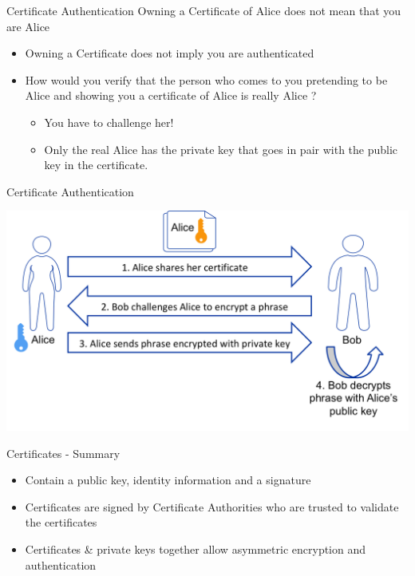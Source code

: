 \documentclass{beamer}
\begin{document}
\begin{frame}{Certificate Authentication}
Owning a Certificate of Alice does not mean that you are Alice
\begin{itemize}
\item Owning a Certificate does not imply you are authenticated
\item How would you verify that the person who comes to you pretending to be Alice and showing you a certificate of Alice is really Alice ?
\begin{itemize}
\item You have to challenge her!
\item Only the real Alice has the private key that goes in pair with the public key in the certificate.
\end{itemize}
\end{itemize}
\end{frame}

\begin{frame}{{\color{red}Certificate Authentication}}
\begin{center}
\includegraphics[width=0.9\linewidth]{certificate-verification.png}
\end{center}
\end{frame}

\begin{frame}{Certificates - Summary}
\begin{itemize}
\item Contain a public key, identity information and a signature
\item Certificates are signed by Certificate Authorities who are trusted to validate the certificates
\item Certificates \& private keys together allow asymmetric encryption and authentication
\end{itemize}
\end{frame}
\end{document}
